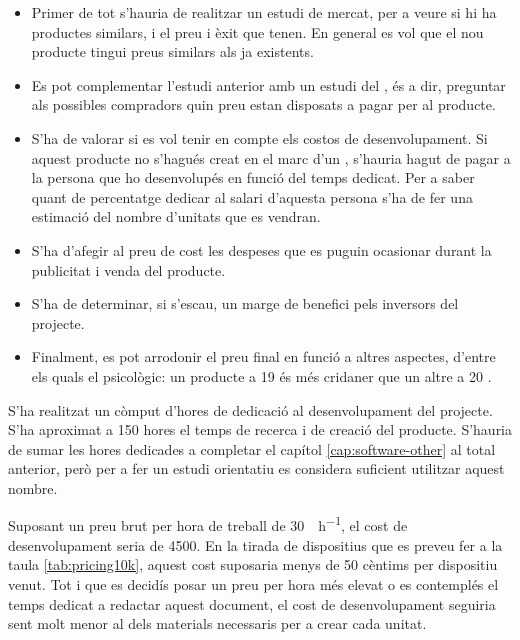 \begin{itemize}
    \item Primer de tot s'hauria de realitzar un estudi de mercat, per a veure
    si hi ha productes similars, i el preu i èxit que tenen. En general es vol
    que el nou producte tingui preus similars als ja existents.
    \item Es pot complementar l'estudi anterior amb un estudi del ,
    és a dir, preguntar als possibles compradors quin preu estan disposats a
    pagar per al producte.
    \item S'ha de valorar si es vol tenir en compte els costos de
    desenvolupament. Si aquest producte no s'hagués creat en el marc d'un ,
    s'hauria hagut de pagar a la persona que ho desenvolupés en funció del
    temps dedicat. Per a saber quant de percentatge dedicar al salari d'aquesta
    persona s'ha de fer una estimació del nombre d'unitats que es vendran.
    \item S'ha d'afegir al preu de cost les despeses que es puguin ocasionar
    durant la publicitat i venda del producte.
    \item S'ha de determinar, si s'escau, un marge de benefici pels inversors
    del projecte.
    \item Finalment, es pot arrodonir el preu final en funció a altres aspectes,
    d'entre els quals el psicològic: un producte a
    \SI[round-mode=places,round-precision=0]{19}{\EUR} és més cridaner que un
    altre a \SI[round-mode=places,round-precision=0]{20}{\EUR}
    \cite{kumar2017impact}.
\end{itemize}

S'ha realitzat un còmput d'hores de dedicació al desenvolupament del projecte.
S'ha aproximat a 150 hores el temps de recerca i de creació del producte.
S'hauria de sumar les hores dedicades a completar el capítol
\ref{cap:software-other} al total anterior, però per a fer un estudi orientatiu
es considera suficient utilitzar aquest nombre.

Suposant un preu brut per hora de treball de
\SI[round-mode=places,round-precision=0]{30}{\EUR\per\hour}, el cost de
desenvolupament seria de \SI[round-mode=places,round-precision=0]{4500}{\EUR}.
En la tirada de dispositius que es preveu fer a la taula \ref{tab:pricing10k},
aquest cost suposaria menys de 50 cèntims per dispositiu venut. Tot i que es
decidís posar un preu per hora més elevat o es contemplés el temps dedicat a
redactar aquest document, el cost de desenvolupament seguiria sent molt menor
al dels materials necessaris per a crear cada unitat.

